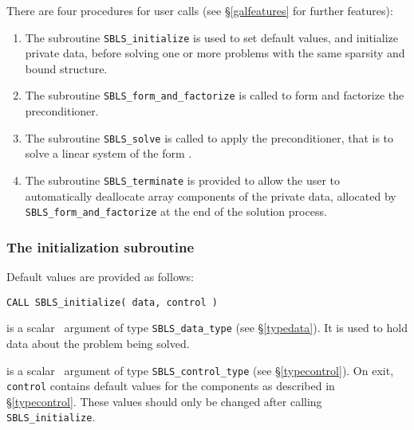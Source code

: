 \documentclass{galahad}
\newcommand{\packagename}{SBLS}
\begin{document}

\galarguments
There are four procedures for user calls
(see \S\ref{galfeatures} for further features):

\begin{enumerate}
\item The subroutine
      {\tt \packagename\_initialize}
      is used to set default values, and initialize private data,
      before solving one or more problems with the
      same sparsity and bound structure.
\item The subroutine
      {\tt \packagename\_form\_and\_factorize}
      is called to form and factorize the preconditioner.
\item The subroutine
      {\tt \packagename\_solve}
      is called to apply the preconditioner, that is to solve a linear
      system of the form .
\item The subroutine
      {\tt \packagename\_terminate}
      is provided to allow the user to automatically deallocate array
       components of the private data, allocated by
       {\tt \packagename\_form\_and\_factorize}
       at the end of the solution process.
\end{enumerate}


\subsubsection{The initialization subroutine}\label{subinit}
 Default values are provided as follows:
\vspace*{1mm}

\hspace{8mm}
{\tt CALL \packagename\_initialize( data, control )}

\vspace*{-3mm}
\begin{description}

 is a scalar \intentinout\ argument of type
{\tt \packagename\_data\_type}
(see \S\ref{typedata}). It is used to hold data about the problem being
solved.

 is a scalar \intentout\ argument of type
{\tt \packagename\_control\_type}
(see \S\ref{typecontrol}).
On exit, {\tt control} contains default values for the components as
described in \S\ref{typecontrol}.
These values should only be changed after calling
{\tt \packagename\_initialize}.

\end{description}
\end{document}
